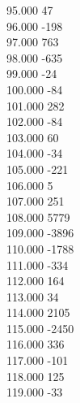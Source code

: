 { 95.000	47 \\
 96.000	-198 \\
 97.000	763 \\
 98.000	-635 \\
 99.000	-24 \\
 100.000	-84 \\
 101.000	282 \\
 102.000	-84 \\
 103.000	60 \\
 104.000	-34 \\
 105.000	-221 \\
 106.000	5 \\
 107.000	251 \\
 108.000	5779 \\
 109.000	-3896 \\
 110.000	-1788 \\
 111.000	-334 \\
 112.000	164 \\
 113.000	34 \\
 114.000	2105 \\
 115.000	-2450 \\
 116.000	336 \\
 117.000	-101 \\
 118.000	125 \\
 119.000	-33 \\
}
